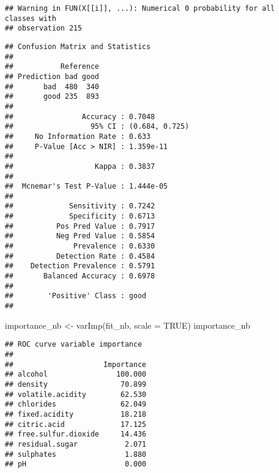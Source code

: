 \documentclass[
]{article}
\newenvironment{Shaded}{\begin{snugshade}}{\end{snugshade}}
\newcommand{\AttributeTok}[1]{\textcolor[rgb]{0.77,0.63,0.00}{#1}}
\newcommand{\ConstantTok}[1]{\textcolor[rgb]{0.00,0.00,0.00}{#1}}
\newcommand{\FunctionTok}[1]{\textcolor[rgb]{0.00,0.00,0.00}{#1}}
\newcommand{\NormalTok}[1]{#1}
\newcommand{\OtherTok}[1]{\textcolor[rgb]{0.56,0.35,0.01}{#1}}
\newcommand{\SpecialCharTok}[1]{\textcolor[rgb]{0.00,0.00,0.00}{#1}}
\newcommand{\StringTok}[1]{\textcolor[rgb]{0.31,0.60,0.02}{#1}}
\begin{document}
\begin{verbatim}
## Warning in FUN(X[[i]], ...): Numerical 0 probability for all classes with
## observation 215
\end{verbatim}

\begin{Shaded}
\end{Shaded}

\begin{verbatim}
## Confusion Matrix and Statistics
## 
##           Reference
## Prediction bad good
##       bad  480  340
##       good 235  893
##                                         
##                Accuracy : 0.7048        
##                  95% CI : (0.684, 0.725)
##     No Information Rate : 0.633         
##     P-Value [Acc > NIR] : 1.359e-11     
##                                         
##                   Kappa : 0.3837        
##                                         
##  Mcnemar's Test P-Value : 1.444e-05     
##                                         
##             Sensitivity : 0.7242        
##             Specificity : 0.6713        
##          Pos Pred Value : 0.7917        
##          Neg Pred Value : 0.5854        
##              Prevalence : 0.6330        
##          Detection Rate : 0.4584        
##    Detection Prevalence : 0.5791        
##       Balanced Accuracy : 0.6978        
##                                         
##        'Positive' Class : good          
## 
\end{verbatim}

\begin{Shaded}
\begin{Highlighting}[]
\NormalTok{importance\_nb }\OtherTok{\textless{}{-}} \FunctionTok{varImp}\NormalTok{(fit\_nb, }\AttributeTok{scale =} \ConstantTok{TRUE}\NormalTok{)}
\NormalTok{importance\_nb}
\end{Highlighting}
\end{Shaded}

\begin{verbatim}
## ROC curve variable importance
## 
##                     Importance
## alcohol                100.000
## density                 70.899
## volatile.acidity        62.530
## chlorides               62.049
## fixed.acidity           18.218
## citric.acid             17.125
## free.sulfur.dioxide     14.436
## residual.sugar           2.071
## sulphates                1.880
## pH                       0.000
\end{verbatim}
\end{document}
